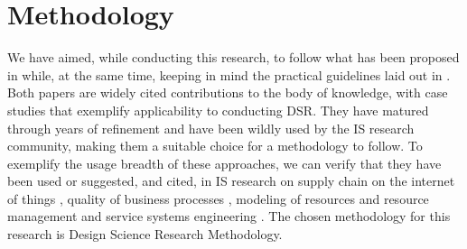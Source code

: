 \section{Methodology}
\label{chap:methods}

We have aimed, while conducting this research, to follow what has been proposed in \cite{peffers_design_2007} while, at the same time, keeping in mind the practical guidelines laid out in \cite{hevner_design_2004}. Both papers are widely cited contributions to the body of knowledge, with case studies that exemplify applicability to conducting DSR. They have matured through years of refinement and have been wildly used by the IS research community, making them a suitable choice for a methodology to follow. To exemplify the usage breadth of these approaches, we can verify that they have been used or suggested, and cited, in IS research on supply chain on the internet of things \cite{geerts_supply_2014}, quality of business processes \cite{heidari_quality_2014}, modeling of resources and resource management \cite{speitkamp_mathematical_2010} and service systems engineering \cite{bohmann_service_2014}. The chosen methodology for this research is Design Science Research Methodology.